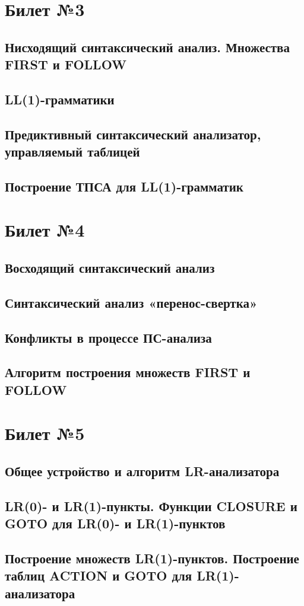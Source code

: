 \documentclass[a4paper]{article}
\begin{document}
\section{Билет №3}
\subsection{Нисходящий синтаксический анализ. Множества FIRST и FOLLOW}
\subsection{LL(1)-грамматики}
\subsection{Предиктивный синтаксический анализатор, управляемый таблицей}
\subsection{Построение ТПСА для LL(1)-грамматик}

\section{Билет №4}
\subsection{Восходящий синтаксический анализ}
\subsection{Синтаксический анализ «перенос-свертка»}
\subsection{Конфликты в процессе ПС-анализа}
\subsection{Алгоритм построения множеств FIRST и FOLLOW}

\section{Билет №5}
\subsection{Общее устройство и алгоритм LR-анализатора}
\subsection{LR(0)- и LR(1)-пункты. Функции CLOSURE и GOTO для LR(0)- и LR(1)-пунктов}
\subsection{Построение множеств LR(1)-пунктов. Построение таблиц ACTION и GOTO для LR(1)-анализатора}
\end{document}
